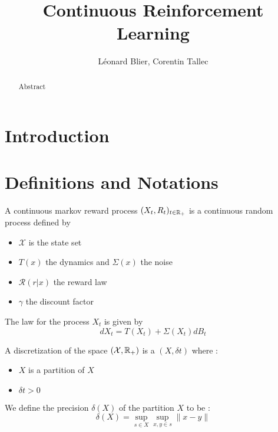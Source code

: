 \documentclass{article}
\title{Continuous Reinforcement Learning}
\author{L\'eonard Blier, Corentin Tallec}
\begin{document}
\maketitle


\begin{abstract}
Abstract
\end{abstract}

\section{Introduction}
\label{sec:introduction}


\section{Definitions and Notations}
\label{sec:definitions}

\begin{definition}
  A continuous markov reward process $(X_{t}, R_{t})_{t\in\mathbb{R}_{+}}$ is a continuous random process defined by 
  \begin{itemize}
  \item $\mathcal{X}$ is the state set 
  \item $T(x)$ the dynamics and $\Sigma (x)$ the noise
  \item $\mathcal{R}(r|x)$ the reward law
  \item $\gamma$ the discount factor
  \end{itemize}
  The law for the process $X_{t}$ is given by
  \begin{equation}
    \label{eq:eqdiffstoch}
    dX_{t} = T(X_{t}) + \Sigma(X_{t})dB_{t}
  \end{equation}
\end{definition}


\begin{definition}
  A discretization of the space $(\mathcal{X}, \mathbb{R}_{+})$ is a $(X, \delta t)$ where :
  \begin{itemize}
  \item $X$ is a partition of $X$
  \item $\delta t > 0$
  \end{itemize}
  We define the precision $\delta(X)$ of the partition $X$ to be :
  \begin{equation}
    \label{eq:2}
    \delta(X) = \sup_{s\in X}\sup_{x,y \in s}\|x-y\|
  \end{equation}
\end{definition}
\end{document}
